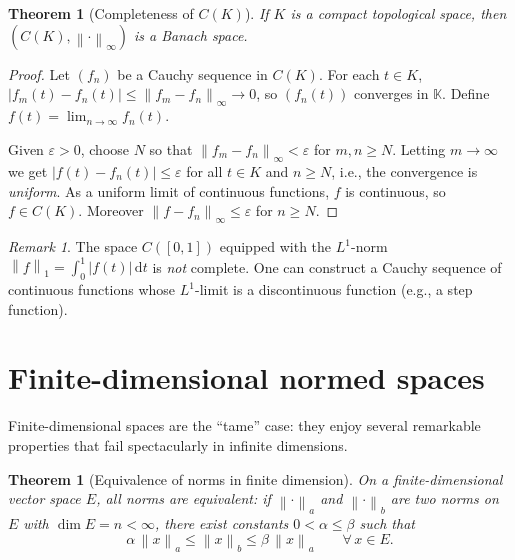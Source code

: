 \documentclass[a4paper,12pt]{book}
\newcommand{\K}{\mathbb{K}}
\newcommand{\dd}{\mathrm{d}}
\newcommand{\norm}[1]{\left\| #1 \right\|}
\newcommand{\abs}[1]{\left| #1 \right|}
\theoremstyle{definition}
\theoremstyle{plain}
\newtheorem{theorem}[definition]{Theorem}
\theoremstyle{remark}
\newtheorem{remark}[definition]{Remark}
\begin{document}
\begin{theorem}[{Completeness of $C(K)$}]
\label{thm:CK-complete}
If $K$ is a compact topological space, then $(C(K),\norm{\cdot}_\infty)$
is a Banach space.
\end{theorem}

\begin{proof}
Let $(f_n)$ be a Cauchy sequence in $C(K)$.  For each $t\in K$,
$\abs{f_m(t)-f_n(t)}\le\norm{f_m-f_n}_\infty\to 0$, so $(f_n(t))$ converges
in $\K$.  Define $f(t)=\lim_{n\to\infty}f_n(t)$.

Given $\varepsilon>0$, choose $N$ so that $\norm{f_m-f_n}_\infty<\varepsilon$
for $m,n\ge N$.  Letting $m\to\infty$ we get
$\abs{f(t)-f_n(t)}\le\varepsilon$ for all $t\in K$ and $n\ge N$, i.e.,
the convergence is \emph{uniform}.  As a uniform
limit of continuous functions, $f$ is continuous, so $f\in C(K)$.  Moreover
$\norm{f-f_n}_\infty\le\varepsilon$ for $n\ge N$.
\end{proof}

\begin{remark}
\label{rem:incomplete-example}
The space $C([0,1])$ equipped with the $L^1$-norm
$\norm{f}_1=\int_0^1\abs{f(t)}\,\dd t$ is \emph{not} complete.  One can
construct a Cauchy sequence of continuous functions whose $L^1$-limit is a
discontinuous function (e.g., a step function).
\end{remark}

\section{Finite-dimensional normed spaces}
\label{sec:finite-dim}

Finite-dimensional spaces are the ``tame'' case: they enjoy several
remarkable properties that fail spectacularly in infinite dimensions.

\begin{theorem}[Equivalence of norms in finite dimension]
\label{thm:norms-equiv}
On a finite-dimensional vector space $E$, all norms are equivalent:
if $\norm{\cdot}_a$ and $\norm{\cdot}_b$ are two norms on~$E$ with
$\dim E = n < \infty$, there exist constants $0<\alpha\le\beta$ such that
\[
  \alpha\,\norm{x}_a \le \norm{x}_b \le \beta\,\norm{x}_a
  \qquad\forall\, x\in E.
\]
\end{theorem}
\end{document}

